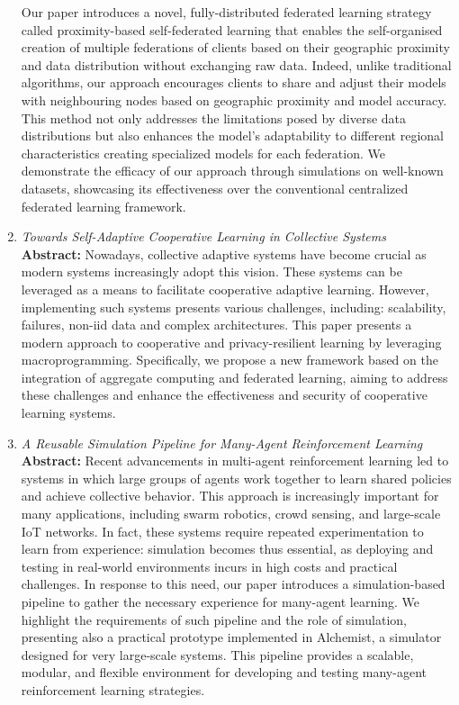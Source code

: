 \documentclass[runningheads]{llncs}
\begin{document}
\begin{enumerate}
    Our paper introduces a novel, fully-distributed federated learning strategy called proximity-based self-federated learning that enables 
     the self-organised creation of multiple federations of clients based on their geographic proximity and data distribution without 
     exchanging raw data.
    Indeed, unlike traditional algorithms, our approach encourages clients to share and adjust their models with neighbouring nodes based on geographic 
     proximity and model accuracy. 
    This method not only addresses the limitations posed by diverse data distributions but also enhances the model's adaptability to different regional 
     characteristics creating specialized models for each federation. We demonstrate the efficacy of our approach through simulations on 
     well-known datasets, showcasing its effectiveness over the conventional centralized federated learning framework.

    \item \emph{Towards Self-Adaptive Cooperative Learning in Collective Systems}~\cite{DBLP:conf/acsos/Domini24} \\
    \textbf{Abstract: }
    Nowadays, collective adaptive systems have become crucial as modern systems increasingly adopt this vision.
    These systems can be leveraged as a means to facilitate cooperative adaptive learning.
    However, implementing such systems presents various challenges, including:
     scalability, failures, non-iid data and complex architectures.
    This paper presents a modern approach to cooperative and privacy-resilient learning by leveraging macroprogramming.
    Specifically, we propose a new framework based on the integration of aggregate computing and federated learning,
     aiming to address these challenges and enhance the effectiveness and security of cooperative learning systems.

    \item \emph{A Reusable Simulation Pipeline for Many-Agent Reinforcement Learning}~\cite{DBLP:conf/dsrt/DominiAPV24} \\
    \textbf{Abstract: }
    Recent advancements in multi-agent reinforcement learning led to systems in which large groups of agents
     work together to learn shared policies and achieve collective behavior.
    This approach is increasingly important for many applications,
     including swarm robotics, crowd sensing, and large-scale IoT networks.
    In fact, these systems require repeated experimentation to learn from experience:
     simulation becomes thus essential, as deploying and testing in real-world environments incurs in high costs and practical challenges.
    In response to this need, our paper introduces a simulation-based pipeline to gather the necessary experience for many-agent learning.
    We highlight the requirements of such pipeline and the role of simulation, presenting also a practical prototype implemented in Alchemist,
     a simulator designed for very large-scale systems.
    This pipeline provides a scalable, modular, and flexible environment for developing and testing many-agent reinforcement learning strategies.
\end{enumerate}
\end{document}
